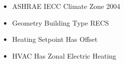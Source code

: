 \begin{itemize}
\item ASHRAE IECC Climate Zone 2004
\item Geometry Building Type RECS
\item Heating Setpoint Has Offset
\item HVAC Has Zonal Electric Heating
\end{itemize}
